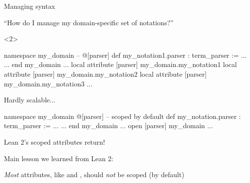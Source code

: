 \documentclass[t]{beamer}
\begin{document}
\begin{frame}[fragile]{Managing syntax }
%

  ``How do I manage my domain-specific set of notations?''

  \pause
  \begin{onlyenv}<2>
\begin{leancode}
namespace my_domain
  -- @[parser]
  def my_notation1.parser : term_parser := ...
  ...
end my_domain
...
local attribute [parser] my_domain.my_notation1
local attribute [parser] my_domain.my_notation2
local attribute [parser] my_domain.my_notation3
...
\end{leancode}

    Hardly scalable...
  \end{onlyenv}%
  \pause%
\begin{leancode}
namespace my_domain
  @[parser]  -- scoped by default
  def my_notation.parser : term_parser := ...
  ...
end my_domain
...
open [parser] my_domain
...
\end{leancode}

  Lean 2's scoped attributes return!
  \pause

  Main lesson we learned from Lean 2:

  \emph{Most} attributes, like \lean{[reducible]} and \lean{[simp]}, should
  \emph{not} be scoped (by default)
\end{frame}
\end{document}
